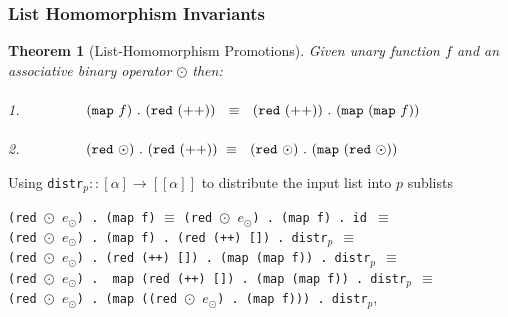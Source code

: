\documentclass{beamer}
\renewcommand{\emph}[1]{\textcolor{structure}{#1}}
\newcommand{\emp}[1]{\textcolor{DikuRed}{ #1}}
\newcommand{\emphh}[1]{\textcolor{CosGreen}{ #1}}
\newtheorem{mytheo}{Theorem}
\begin{document}
\begin{frame}[fragile,t]
  \frametitle{List Homomorphism Invariants}



\begin{mytheo}[List-Homomorphism Promotions]\label{LHomInv}\vspace{-2ex}
Given unary function $f$ and an associative binary operator $\odot$ then: \\
$\mbox{ }$ \\
1. $\mbox{ }\mbox{ }\mbox{ }\mbox{ }\mbox{ }\mbox{ }$
$({\tt map} \mbox{ }f)\mbox{ }.\mbox{ }({\tt red}\mbox{ }({\tt ++})) \mbox{ }\mbox{ }\equiv\mbox{ }\mbox{ }({\tt red}\mbox{ }({\tt ++}))\mbox{ }.\mbox{ }({\tt map}\mbox{ }({\tt map}\mbox{ }f) )$ \\
$\mbox{ }$ \\
2. $\mbox{ }\mbox{ }\mbox{ }\mbox{ }\mbox{ }\mbox{ }$
$({\tt red}\mbox{ }\odot)\mbox{ }.\mbox{ }({\tt red}\mbox{ }(++)) \mbox{ }\equiv\mbox{ }\mbox{ }({\tt red}\mbox{ }\odot)\mbox{ }.\mbox{ }({\tt map}\mbox{ }({\tt red}\mbox{ }\odot) )$
\end{mytheo}

\bigskip

Using {\tt distr}$_p :: [\alpha] \rightarrow [[\alpha]]$ to distribute the input list into $p$ sublists

\bigskip

\emp{{\tt (red $\odot$ $e_\odot$) . (map f)} $\equiv$} 
{\scriptsize {\tt (red $\odot$ $e_\odot$) . (map f) . \emph{id} $\equiv$}\\
{\tt (red~$\odot$~$e_\odot$) . \emph{(map~f) . (red~(++)~[])} . distr$_p~~\equiv$} \\
{\tt \emph{(red~$\odot$~$e_\odot$) . (red~(++)~[])} . (map~(map f)) . distr$_p~~\equiv$} \\
{\tt (red~$\odot$~$e_\odot$) . \emphh{map (red~(++)~[]) . (map~(map f))} . distr$_p~~\equiv$} }\\
\emp{{\tt (red~$\odot$~$e_\odot$)~.~(map ((red $\odot$ $e_\odot$)~.~(map f)))~.~distr$_p$}},

\end{frame}
\end{document}
